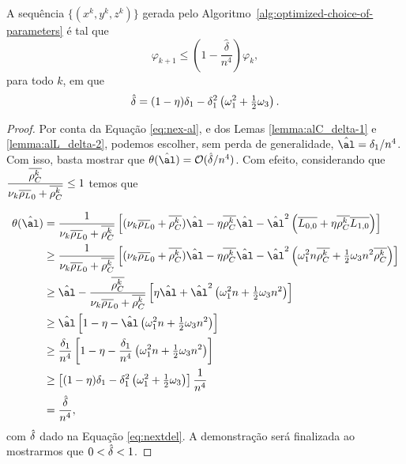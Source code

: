\begin{lema}\label{lemma:next-phi-delta-n4}
A sequência $\{(x^{k},y^{k},z^{k})\}$ gerada pelo Algoritmo~\ref{alg:optimized-choice-of-parameters} é tal que
\begin{equation}
		\label{eq:varphi-delta-n4}
				\varphi_{k+1}\leq \left(1 - \frac{\hat{\delta}}{n^{4}}\right)\varphi_{k},
	\end{equation}
	para todo $k$, em que 
	\begin{equation}
		\label{eq:nextdel}
		 \hat{\delta} =(1 -  \eta)\delta_{1} - \delta_{1}^{2}\left(\omega_1^{2} + \tfrac{1}{2}\omega_{3} \right).
	\end{equation}
\end{lema}


\begin{proof} Por conta da Equação \eqref{eq:nex-al}, e dos Lemas \ref{lemma:alC_delta-1} e \ref{lemma:alL_delta-2}, podemos escolher, sem perda de generalidade, $\nextal = \delta_{1}/n^{4}$. Com isso, basta mostrar que $\theta(\nextal)= \Oset(\nextdel/n^{4})$. Com efeito, considerando que $\dfrac{\overline{\rho_C^{k}} }{\nu_{k} \overline{\rho_L}_0 + \overline{\rho_C^{k}} }\leq 1$ temos que


\[
	\begin{aligned}
		\theta(\nextal)%
						& = \dfrac{1}{\nuk \dbvec{\rho_L}_0 + \rhoCkb }\left[ (\nuk \dbvec{\rho_L}_0 + \rhoCkb )\nextal -  \eta\rhoCkb \nextal - \nextal^{2}\left(\dbvec{L_{0,0}} + \eta\rhoCkb  \dbvec{L_{1,0}} \right) \right] \\
						& \geq \dfrac{1}{\nuk \dbvec{\rho_L}_0 + \rhoCkb }\left[ (\nuk \dbvec{\rho_L}_0 + \rhoCkb )\nextal -  \eta\rhoCkb \nextal - \nextal^{2}\left(\omega_1^{2} n\rhoCkb  + \tfrac{1}{2}\omega_{3}n^{2}\rhoCkb  \right) \right]\\
						& \geq \nextal - \dfrac{\rhoCkb }{\nuk \dbvec{\rho_L}_0 + \rhoCkb } \left[   \eta\nextal + \nextal^{2}\left(\omega_1^{2} n + \tfrac{1}{2}\omega_{3}n^{2} \right) \right]\\
						& \geq \nextal \left[ 1 -  \eta - \nextal\left(\omega_1^{2} n + \tfrac{1}{2}\omega_{3}n^{2} \right) \right] \\
						& \geq \frac{\delta_{1}}{n^{4}} \left[ 1 -  \eta - \frac{\delta_{1}}{n^{4}}\left(\omega_1^{2} n + \tfrac{1}{2}\omega_{3}n^{2} \right) \right] \\
						& \geq 	 \left[ (1 -  \eta)\delta_{1} - \delta_{1}^{2}\left(\omega_1^{2} + \tfrac{1}{2}\omega_{3} \right) \right] \frac{1}{n^{4}}	\\
						& = \frac{\nextdel}{n^{4}},		
		\end{aligned}
	\]
	com 	$\hat{\delta}$ dado na Equação \eqref{eq:nextdel}. A demonstração será finalizada ao mostrarmos que $0<\hat{\delta}<1$.


\end{proof}
